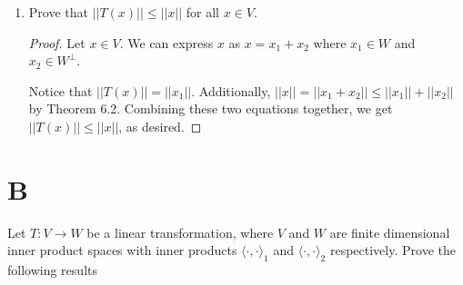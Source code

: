 \documentclass[11pt]{scrartcl}
\begin{document}
\begin{enumerate}[label=\alph*.]
{\begin{proof}
		      It is clear that $T(n) = 0$, so $n \in N(T)$. Thus, $W^{\bot} \subseteq N(T)$.
	      \end{proof}
	      }
	\item{
	      Prove that $||T(x)|| \leq ||x||$ for all $x \in V$.
	      \begin{proof}
		      Let $x \in V$. We can express $x$ as $x = x_1 + x_2$ where $x_1 \in W$ and $x_2 \in W^{\bot}$.\par
		      Notice that $||T(x)|| = ||x_1||$. Additionally, $||x|| = ||x_1 + x_2|| \leq ||x_1||+ ||x_2||$ by Theorem 6.2.
		      Combining these two equations together, we get $||T(x)|| \leq ||x||$, as desired.
	      \end{proof}
	      }
\end{enumerate}

\section{B}
Let $T: V \rightarrow W$ be a linear transformation, where $V$ and $W$ are finite dimensional inner product spaces with inner
products $\langle \cdot,\cdot \rangle_1$ and $\langle \cdot,\cdot \rangle_2$ respectively. Prove the following results
\end{document}
